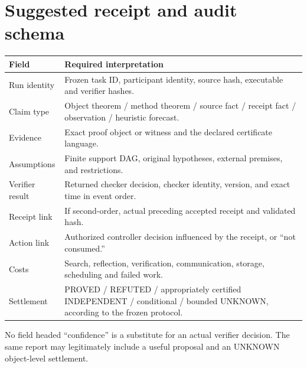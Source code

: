 \documentclass[11pt,letterpaper]{article}
\begin{document}
\section{Suggested receipt and audit schema}
\begin{small}
\begin{tabularx}{\linewidth}{@{}p{33mm}X@{}}
\toprule
Field & Required interpretation\\
\midrule
Run identity & Frozen task ID, participant identity, source hash, executable and verifier hashes.\\
Claim type & Object theorem / method theorem / source fact / receipt fact / observation / heuristic forecast.\\
Evidence & Exact proof object or witness and the declared certificate language.\\
Assumptions & Finite support DAG, original hypotheses, external premises, and restrictions.\\
Verifier result & Returned checker decision, checker identity, version, and exact time in event order.\\
Receipt link & If second-order, actual preceding accepted receipt and validated hash.\\
Action link & Authorized controller decision influenced by the receipt, or ``not consumed.''\\
Costs & Search, reflection, verification, communication, storage, scheduling and failed work.\\
Settlement & PROVED / REFUTED / appropriately certified INDEPENDENT / conditional / bounded UNKNOWN, according to the frozen protocol.\\
\bottomrule
\end{tabularx}
\end{small}
No field headed ``confidence'' is a substitute for an actual verifier decision. The same report may legitimately include a useful proposal and an UNKNOWN object-level settlement.
\end{document}
